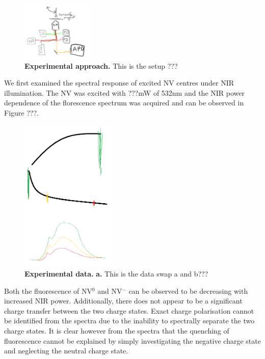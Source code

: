 \documentclass[,prl,twocolumn]{revtex4}
\begin{document}
\begin{figure}[t]
  \centering
  \includegraphics[width=0.3\textwidth]{Setup.png} 
 \caption{\textbf{Experimental approach.} This is the setup ???} \label{FigSetup}
\end{figure}

We first examined the spectral response of excited NV centres under NIR illumination. The NV was excited with ???mW of 532nm and the NIR power dependence of the florescence spectrum was acquired and can be observed in Figure ???.

\begin{figure}[H]
  \centering
  \includegraphics[width=0.4\textwidth]{Spectra.png} 
 \caption{\textbf{Experimental data.} \textbf{a.} This is the data swap a and b???} \label{FigSpectra}
\end{figure}

Both the fluorescence of NV$^0$ and NV$^-$ can be observed to be decreasing with increased NIR power. Additionally, there does not appear to be a significant charge transfer between the two charge states. Exact charge polarisation cannot be identified from the spectra due to the inability to spectrally separate the two charge states. It is clear however from the spectra that the quenching of fluorescence cannot be explained by simply investigating the negative charge state and neglecting the neutral charge state.
\end{document}
